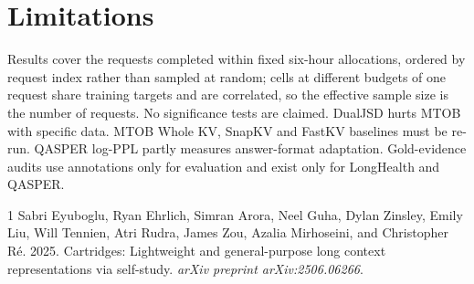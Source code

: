 \documentclass[11pt]{article}
\begin{document}
\section{Limitations}
Results cover the requests completed within fixed six-hour allocations, ordered by request index rather than sampled at random; cells at different budgets of one request share training targets and are correlated, so the effective sample size is the number of requests. No significance tests are claimed. DualJSD hurts MTOB with specific data. MTOB Whole KV, SnapKV and FastKV baselines must be re-run. QASPER log-PPL partly measures answer-format adaptation. Gold-evidence audits use annotations only for evaluation and exist only for LongHealth and QASPER.

\begin{thebibliography}{1}
Sabri Eyuboglu, Ryan Ehrlich, Simran Arora, Neel Guha, Dylan Zinsley, Emily Liu, Will Tennien, Atri Rudra, James Zou, Azalia Mirhoseini, and Christopher R\'e. 2025.
\newblock Cartridges: Lightweight and general-purpose long context representations via self-study.
\newblock \emph{arXiv preprint arXiv:2506.06266}.
\end{thebibliography}
\end{document}
